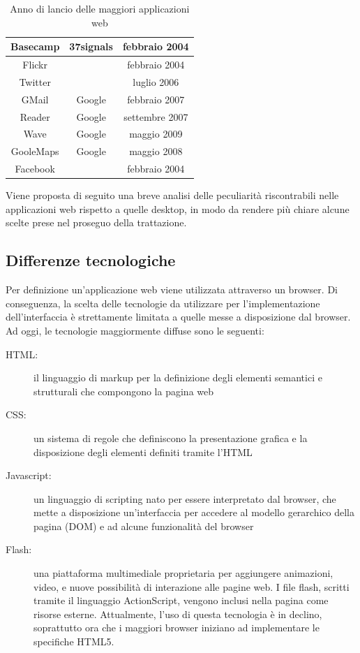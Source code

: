 \begin{table}[htdp]
\caption{Anno di lancio delle maggiori applicazioni web}
\begin{center}
\begin{tabular}{|c|c|c|}
\hline
Basecamp & 37signals & febbraio 2004\\\hline
Flickr & & febbraio 2004\\\hline
Twitter & & luglio 2006\\\hline
GMail & Google & febbraio 2007\\\hline
Reader & Google & settembre 2007\\\hline
Wave & Google & maggio 2009\\\hline
GooleMaps & Google & maggio 2008\\\hline
Facebook & & febbraio 2004\\\hline
\end{tabular}
\end{center}
\label{default}
\end{table}%


Viene proposta di seguito una breve analisi delle peculiarità riscontrabili nelle applicazioni web rispetto a quelle desktop, in modo da rendere più chiare alcune scelte prese nel proseguo della trattazione.

\subsection{Differenze tecnologiche}

Per definizione un'applicazione web viene utilizzata attraverso un browser. Di conseguenza, la scelta delle tecnologie da utilizzare per l'implementazione dell'interfaccia è strettamente limitata a quelle messe a disposizione dal browser. 
Ad oggi, le tecnologie maggiormente diffuse sono le seguenti:

\begin{description}
\item[HTML:] il linguaggio di markup per la definizione degli elementi semantici e strutturali che compongono la pagina web
\item[CSS:] un sistema di regole che definiscono la presentazione grafica e la disposizione degli elementi definiti tramite l'HTML
\item[Javascript:]  un linguaggio di scripting nato per essere interpretato dal browser, che mette a disposizione un'interfaccia per accedere al modello gerarchico della pagina (DOM) e ad alcune funzionalità del browser
\item[Flash:] una piattaforma multimediale proprietaria per aggiungere animazioni, video, e nuove possibilità di interazione alle pagine web. I file flash, scritti tramite il linguaggio ActionScript, vengono inclusi nella pagina come risorse esterne. Attualmente, l'uso di questa tecnologia è in declino,  soprattutto ora che i maggiori browser iniziano ad implementare le specifiche HTML5.
\end{description}

